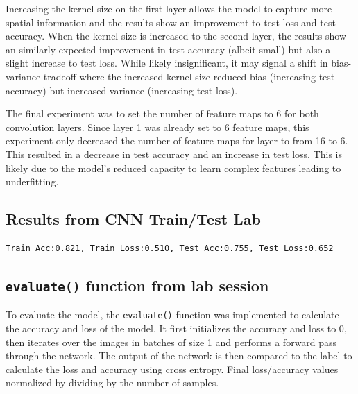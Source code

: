 \documentclass[twocolumn]{article}
\begin{document}
Increasing the kernel size on the first layer allows the model to capture more spatial information and the results show an improvement to test loss and test accuracy. When the kernel size is increased to the second layer, the results show an similarly expected improvement in test accuracy (albeit small) but also a slight increase to test loss. While likely insignificant, it may signal a shift in bias-variance tradeoff where the increased kernel size reduced bias (increasing test accuracy) but increased variance (increasing test loss).

The final experiment was to set the number of feature maps to 6 for both convolution layers. Since layer 1 was already set to 6 feature maps, this experiment only decreased the number of feature maps for layer to from 16 to 6. This resulted in a decrease in test accuracy and an increase in test loss. This is likely due to the model's reduced capacity to learn complex features leading to underfitting.

\subsection*{Results from CNN Train/Test Lab}

\begin{verbatim}
Train Acc:0.821, Train Loss:0.510, Test Acc:0.755, Test Loss:0.652
\end{verbatim}

\subsection*{\texttt{evaluate()} function from lab session}

To evaluate the model, the \texttt{evaluate()} function was implemented to calculate the accuracy and loss of the model. It first initializes the accuracy and loss to 0, then iterates over the images in batches of size 1 and performs a forward pass through the network. The output of the network is then compared to the label to calculate the loss and accuracy using cross entropy. Final loss/accuracy values normalized by dividing by the number of samples.
\end{document}
